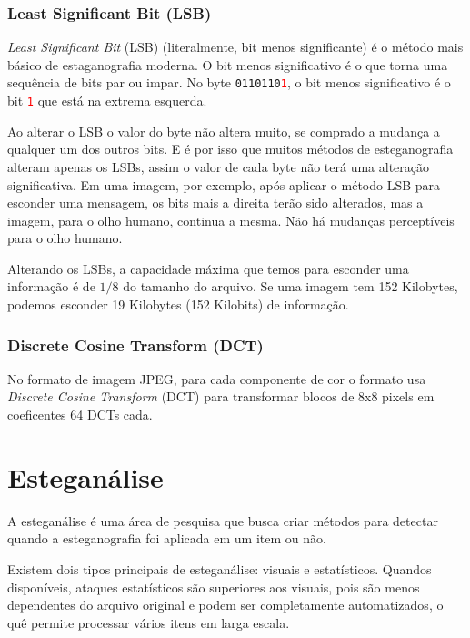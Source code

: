 \subsubsection{Least Significant Bit (LSB)}

\emph{Least Significant Bit} (LSB) (literalmente, bit menos significante) é o método mais básico de estaganografia moderna. O bit menos significativo é o que torna uma sequência de bits par ou impar. No byte \texttt{0110110\textcolor{red}{1}}, o bit menos significativo é o bit \texttt{\textcolor{red}{1}} que está na extrema esquerda.

Ao alterar o LSB o valor do byte não altera muito, se comprado a mudança a qualquer um dos outros bits. E é por isso que muitos métodos de esteganografia alteram apenas os LSBs, assim o valor de cada byte não terá uma alteração significativa. Em uma imagem, por exemplo, após aplicar o método LSB para esconder uma mensagem, os bits mais a direita terão sido alterados, mas a imagem, para o olho humano, continua a mesma. Não há mudanças perceptíveis para o olho humano.

Alterando os LSBs, a capacidade máxima que temos para esconder uma informação é de $1/8$ do tamanho do arquivo. Se uma imagem tem 152 Kilobytes, podemos esconder 19 Kilobytes (152 Kilobits) de informação.

\subsubsection{Discrete Cosine Transform (DCT)}

No formato de imagem JPEG, para cada componente de cor o formato usa \emph{Discrete Cosine Transform} (DCT) para transformar blocos de 8x8 pixels em coeficentes 64 DCTs cada. \cite{provos_hide_2003}


\section{Esteganálise}

A esteganálise é uma área de pesquisa que busca criar métodos para detectar quando a esteganografia foi aplicada em um item ou não.

Existem dois tipos principais de esteganálise: visuais e estatísticos. Quandos disponíveis, ataques estatísticos são superiores aos visuais, pois são menos dependentes do arquivo original e podem ser completamente automatizados, o quê permite processar vários itens em larga escala. \cite{westfeld1999attacks}

